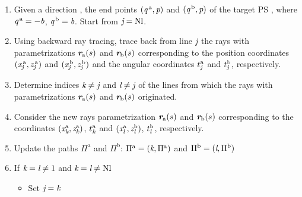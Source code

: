 \begin{enumerate}
\item Given a direction , the end points $(\textit{q}^{\,\textrm{a}}, \textit{p})$ and $(\textit{q}^{\,\textrm{b}}, \textit{p})$ of the target PS , where $\textit{q}^{\,\textrm{a}} = -\textit{b}$, $\textit{q}^{\,\textrm{b}} = \textit{b}$. Start from $\textit{j}=\textrm{Nl}$.
\item \label{ray trace} Using backward ray tracing, trace back from line $\textit{j}$ the rays with parametrizations $\textit{\textbf{r}}_{\textrm{a}}(s)$ and $\textit{\textbf{r}}_\textrm{b}(s)$ corresponding to the position coordinates $(\textit{x}_{\textit{j}}^{\,\textrm{a}}, \textit{z}_{\textit{j}}^{\,\textrm{a}})$ and $ (\textit{x}_{\textit{j}}^{\,\textrm{b}}, \textit{z}_{\textit{j}}^{\,\textrm{b}})$ and the angular coordinates $t_{\textit{j}}^{\textrm{a}}$ and $t_{\textit{j}}^{\textrm{b}}$, respectively. 
\item Determine indices $\textit{k}\neq\textit{j}$ and $\textit{l}\neq\textit{j}$ of the lines from which the rays with parametrizations $\textit{\textbf{r}}_{\textrm{a}}(s)$ and $\textit{\textbf{r}}_{\textrm{b}}(s)$ originated.
\item Consider the new rays parametrization $\textit{\textbf{r}}_{\textrm{a}}(s)$ and $\textit{\textbf{r}}_{\textrm{b}}(s)$ corresponding to the coordinates $(\textit{x}_{\textit{k}}^{\textrm{a}}, \textit{z}_{\textit{k}}^{\textrm{a}})$, $t_{\textit{k}}^{\textrm{a}}$ and $(\textit{x}_{\textit{l}}^{\textrm{a}}, \textit{z}_{\textit{l}}^{\textrm{b}})$, $t_{\textit{l}}^{\textrm{b}}$, respectively.
\item Update the paths $\Pi^\textrm{a}$ and $\Pi^\textrm{b}$: $\Pi^\textrm{a} = (\textit{k}, \Pi^{\textrm{a}})$ and $\Pi^\textrm{b} = (\textit{l}, \Pi^\textrm{b})$
\item If $\textit{k}=\textit{l} \neq 1$ and $\textit{k}=\textit{l} \neq \textrm{Nl}$
\begin{itemize}
\item Set $\textit{j}=\textit{k}$

\end{itemize}
\end{enumerate}
